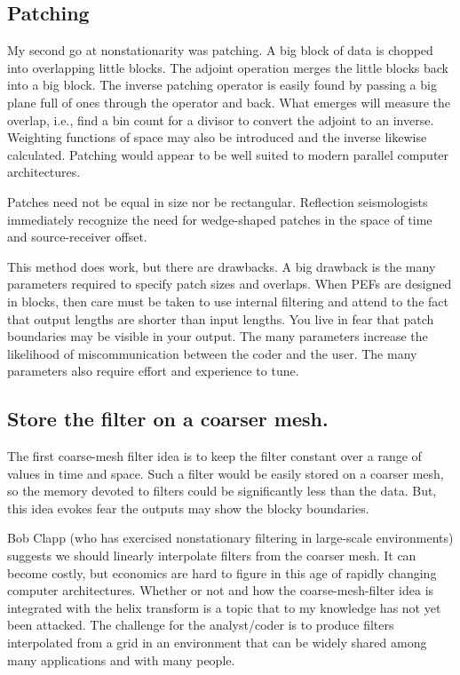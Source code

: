 \subsection{Patching}
My second go at nonstationarity was patching.
A big block of data is chopped into overlapping little blocks.
The adjoint operation merges the little blocks back into a big block.
The inverse patching operator is easily found by passing a big plane full of ones through the operator and back.
What emerges will measure the overlap,
i.e., find a bin count for a divisor
to convert the adjoint to an inverse.
Weighting functions of space may also be introduced
and the inverse likewise calculated.
Patching would appear to be well suited to modern parallel computer architectures.
\par
Patches need not be equal in size nor be rectangular.
Reflection seismologists immediately recognize the need for wedge-shaped patches in the space
of time and source-receiver offset.

\par
This method does work, but there are drawbacks.
A big drawback is the many parameters required to specify
patch sizes and overlaps.
When PEFs are designed in blocks,
then care must be taken to use internal filtering
and attend to the fact that output lengths are shorter than input lengths.
You live in fear that patch boundaries may be visible in your output.
The many parameters increase the likelihood of miscommunication between
the coder and the user.
The many parameters also require effort and experience to tune.
\par

\subsection{Store the filter on a coarser mesh.}
The first coarse-mesh filter idea
is to keep the filter constant over a range of values in time and space.
Such a filter would be easily stored on a coarser mesh,
so the memory devoted to filters could be significantly less than the data.
But,
this idea evokes fear the outputs may show the blocky boundaries.

\par
Bob Clapp (who has exercised nonstationary filtering in large-scale environments)
suggests we should linearly interpolate filters from the coarser mesh.
It can become costly, but economics are hard to figure
in this age of rapidly changing computer architectures.
Whether or not and how the coarse-mesh-filter idea is integrated with the helix transform
is a topic that to my knowledge has not yet been attacked.
The challenge for the analyst/coder is to produce
filters interpolated from a grid
in an environment that
can be widely shared among many applications
and with many people.




